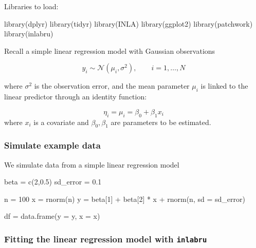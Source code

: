 \documentclass[
  letterpaper,
  DIV=11,
  numbers=noendperiod]{scrartcl}
\newenvironment{Shaded}{\begin{snugshade}}{\end{snugshade}}
\newcommand{\AttributeTok}[1]{\textcolor[rgb]{0.40,0.45,0.13}{#1}}
\newcommand{\DecValTok}[1]{\textcolor[rgb]{0.68,0.00,0.00}{#1}}
\newcommand{\FloatTok}[1]{\textcolor[rgb]{0.68,0.00,0.00}{#1}}
\newcommand{\FunctionTok}[1]{\textcolor[rgb]{0.28,0.35,0.67}{#1}}
\newcommand{\NormalTok}[1]{\textcolor[rgb]{0.00,0.23,0.31}{#1}}
\newcommand{\OtherTok}[1]{\textcolor[rgb]{0.00,0.23,0.31}{#1}}
\newcommand{\SpecialCharTok}[1]{\textcolor[rgb]{0.37,0.37,0.37}{#1}}
\begin{document}
Libraries to load:

\begin{Shaded}
\begin{Highlighting}[]
\FunctionTok{library}\NormalTok{(dplyr)}
\FunctionTok{library}\NormalTok{(tidyr)}
\FunctionTok{library}\NormalTok{(INLA)}
\FunctionTok{library}\NormalTok{(ggplot2)}
\FunctionTok{library}\NormalTok{(patchwork)}
\FunctionTok{library}\NormalTok{(inlabru)     }
\end{Highlighting}
\end{Shaded}

Recall a simple linear regression model with Gaussian observations

\[
y_i\sim\mathcal{N}(\mu_i, \sigma^2), \qquad i = 1,\dots,N
\]

where \(\sigma^2\) is the observation error, and the mean parameter
\(\mu_i\) is linked to the linear predictor through an identity
function:

\[
\eta_i = \mu_i = \beta_0 + \beta_1 x_i
\] where \(x_i\) is a covariate and \(\beta_0, \beta_1\) are parameters
to be estimated.

\subsubsection{Simulate example data}\label{simulate-example-data}

We simulate data from a simple linear regression model

\begin{Shaded}
\begin{Highlighting}[]
\NormalTok{beta }\OtherTok{=} \FunctionTok{c}\NormalTok{(}\DecValTok{2}\NormalTok{,}\FloatTok{0.5}\NormalTok{)}
\NormalTok{sd\_error }\OtherTok{=} \FloatTok{0.1}

\NormalTok{n }\OtherTok{=} \DecValTok{100}
\NormalTok{x }\OtherTok{=} \FunctionTok{rnorm}\NormalTok{(n)}
\NormalTok{y }\OtherTok{=}\NormalTok{ beta[}\DecValTok{1}\NormalTok{] }\SpecialCharTok{+}\NormalTok{ beta[}\DecValTok{2}\NormalTok{] }\SpecialCharTok{*}\NormalTok{ x }\SpecialCharTok{+} \FunctionTok{rnorm}\NormalTok{(n, }\AttributeTok{sd =}\NormalTok{ sd\_error)}

\NormalTok{df }\OtherTok{=} \FunctionTok{data.frame}\NormalTok{(}\AttributeTok{y =}\NormalTok{ y, }\AttributeTok{x =}\NormalTok{ x)  }
\end{Highlighting}
\end{Shaded}

\subsubsection{\texorpdfstring{Fitting the linear regression model with
\texttt{inlabru}}{Fitting the linear regression model with inlabru}}\label{fitting-the-linear-regression-model-with-inlabru}
\end{document}
